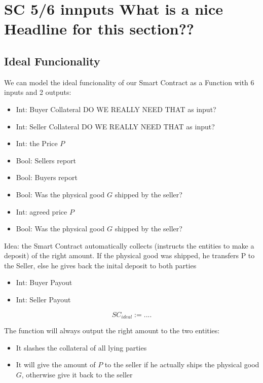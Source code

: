 \documentclass{cacthesis}
\begin{document}
\section{SC 5/6 innputs What is a nice Headline for this section??}
\subsection{Ideal Funcionality}
We can model the ideal funcionality of our Smart Contract as a Function with 6 inputs and 2 outputs:

\begin{itemize}
\item{Int: Buyer Collateral DO WE REALLY NEED THAT as input?}
\item{Int: Seller Collateral DO WE REALLY NEED THAT as input?}
\item{Int: the Price $P$}
\item{Bool: Sellers report}
\item{Bool: Buyers report}
\item{Bool: Was the physical good $G$ shipped by the seller?}
\end{itemize}

\begin{itemize}
\item{Int: agreed price $P$}
\item{Bool: Was the physical good $G$ shipped by the seller?}
\end{itemize}
Idea: the Smart Contract automatically collects  (instructs the entities to make a deposit) of the right amount. If the physical good was shipped, he transfers P to the Seller, else he gives back the inital deposit to both parties

\begin{itemize}
\item{Int: Buyer Payout}
\item{Int: Seller Payout}
\end{itemize}

\begin{equation}
	SC_{ideal}:= ....	
\end{equation}

The function will always output the right amount to the two entities:
\begin{itemize}
    \item It slashes the collateral of all lying parties
    \item It will give the amount of $P$ to the seller if he actually ships the physical good $G$, otherwise give it back to the seller
\end{itemize}
\end{document}
